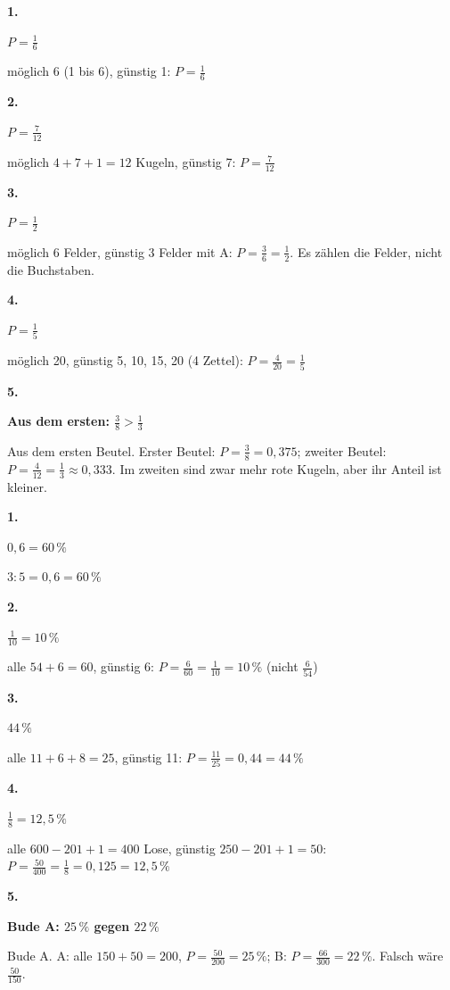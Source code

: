 \documentclass[11pt]{article}
\newcommand{\lsg}[3]{\par\noindent\begin{minipage}[t]{9mm}\textbf{#1}\end{minipage}%
  \begin{minipage}[t]{52mm}\raggedright\bfseries\boldmath #2\end{minipage}\hspace{3mm}%
  \begin{minipage}[t]{\dimexpr\linewidth-64mm\relax}\raggedright\small #3\end{minipage}\par\vspace{4pt}}
\begin{document}
\par\smallskip
{}\par
\par\Needspace{25mm}\vspace{6pt}\noindent\colorbox{black!12}{}\hspace{2mm}{\bfseries Günstig durch möglich}\par\vspace{4pt}
\lsg{1.}{$P = \frac{1}{6}$}{möglich 6 (1 bis 6), günstig 1: $P = \frac{1}{6}$}
\lsg{2.}{$P = \frac{7}{12}$}{möglich $4 + 7 + 1 = 12$ Kugeln, günstig 7: $P = \frac{7}{12}$}
\lsg{3.}{$P = \frac{1}{2}$}{möglich 6 Felder, günstig 3 Felder mit A: $P = \frac{3}{6} = \frac{1}{2}$. Es zählen die Felder, nicht die Buchstaben.}
\lsg{4.}{$P = \frac{1}{5}$}{möglich 20, günstig 5, 10, 15, 20 (4 Zettel): $P = \frac{4}{20} = \frac{1}{5}$}
\lsg{5.}{Aus dem ersten: $\frac{3}{8} > \frac{1}{3}$}{Aus dem ersten Beutel. Erster Beutel: $P = \frac{3}{8} = 0{,}375$; zweiter Beutel: $P = \frac{4}{12} = \frac{1}{3} \approx 0{,}333$. Im zweiten sind zwar mehr rote Kugeln, aber ihr Anteil ist kleiner.}
\par\Needspace{25mm}\vspace{6pt}\noindent\colorbox{black!12}{}\hspace{2mm}{\bfseries Alle mitzählen, in Prozent}\par\vspace{4pt}
\lsg{1.}{$0{,}6 = 60\,\%$}{$3 : 5 = 0{,}6 = 60\,\%$}
\lsg{2.}{$\frac{1}{10} = 10\,\%$}{alle $54 + 6 = 60$, günstig 6: $P = \frac{6}{60} = \frac{1}{10} = 10\,\%$ (nicht $\frac{6}{54}$)}
\lsg{3.}{$44\,\%$}{alle $11 + 6 + 8 = 25$, günstig 11: $P = \frac{11}{25} = 0{,}44 = 44\,\%$}
\lsg{4.}{$\frac{1}{8} = 12{,}5\,\%$}{alle $600 - 201 + 1 = 400$ Lose, günstig $250 - 201 + 1 = 50$: $P = \frac{50}{400} = \frac{1}{8} = 0{,}125 = 12{,}5\,\%$}
\lsg{5.}{Bude A: $25\,\%$ gegen $22\,\%$}{Bude A. A: alle $150 + 50 = 200$, $P = \frac{50}{200} = 25\,\%$; B: $P = \frac{66}{300} = 22\,\%$. Falsch wäre $\frac{50}{150}$.}
\par\Needspace{25mm}\vspace{6pt}\noindent\colorbox{black!12}{}\hspace{2mm}{\bfseries Gegenereignis: „nicht“ und „weder … noch“}\par\vspace{4pt}
\end{document}
